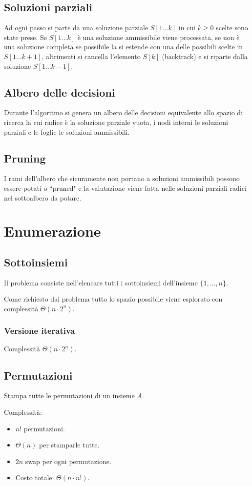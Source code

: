 \subsection{Soluzioni parziali}
Ad ogni passo si parte da una soluzione parziale $S[1\dots k]$ in cui $k\ge 0$ scelte sono state prese. Se $S[1\dots k]$ \`e una soluzione ammissibile viene processata, se non \`e 
una soluzione completa se possibile la si estende con una delle possibili scelte in $S[1\dots k+1]$, altrimenti si cancella l'elemento $S[k]$ (backtrack) e si riparte dalla soluzione
$S[1\dots k-1]$.
\subsection{Albero delle decisioni}
Durante l'algoritmo si genera un albero delle decisioni equivalente allo spazio di ricerca la cui radice \`e la soluzione parziale vuota, i nodi interni le soluzioni parziali e le
foglie le soluzioni ammissibili.
\subsection{Pruning}
I rami dell'albero che sicuramente non portano a soluzioni ammissibili possono essere potati o ``pruned" e la valutazione viene fatta nelle soluzioni parziali radici nel sottoalbero da
potare.
\section{Enumerazione}

\subsection{Sottoinsiemi}
Il problema consiste nell'elencare tutti i sottoinsiemi dell'insieme $\{1, \dots, n\}$.
\begin{multicols}{2}

\columnbreak


\end{multicols}
Come richiesto dal problema tutto lo spazio possibile viene esplorato con complessit\`a $\Theta(n\cdot 2^n)$.
\subsubsection{Versione iterativa}

Complessit\`a $\Theta(n\cdot 2^n)$.
\subsection{Permutazioni}
Stampa tutte le permutazioni di un insieme $A$.
\begin{multicols}{2}

\columnbreak

Complessit\`a:
\begin{itemize}
	\item $n!$ permutazioni.
	\item $\Theta(n)$ per stamparle tutte.
	\item $2n$ swap per ogni permutazione.
	\item Costo totale: $\Theta(n\cdot n!)$.
\end{itemize}
\end{multicols}
